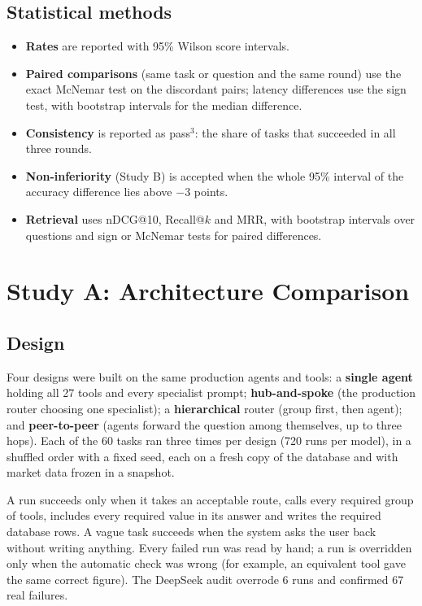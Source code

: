\documentclass[11pt,a4paper]{article}
\begin{document}
\subsection{Statistical methods}
\begin{itemize}
\item \textbf{Rates} are reported with 95\% Wilson score intervals.
\item \textbf{Paired comparisons} (same task or question and the same round) use the exact McNemar test on the discordant pairs; latency differences use the sign test, with bootstrap intervals for the median difference.
\item \textbf{Consistency} is reported as pass$^{3}$: the share of tasks that succeeded in all three rounds.
\item \textbf{Non-inferiority} (Study B) is accepted when the whole 95\% interval of the accuracy difference lies above $-3$ points.
\item \textbf{Retrieval} uses nDCG@10, Recall@$k$ and MRR, with bootstrap intervals over questions and sign or McNemar tests for paired differences.
\end{itemize}

\section{Study A: Architecture Comparison}

\subsection{Design}
Four designs were built on the same production agents and tools: a \textbf{single agent} holding all 27 tools and every specialist prompt; \textbf{hub-and-spoke} (the production router choosing one specialist); a \textbf{hierarchical} router (group first, then agent); and \textbf{peer-to-peer} (agents forward the question among themselves, up to three hops). Each of the 60 tasks ran three times per design (720 runs per model), in a shuffled order with a fixed seed, each on a fresh copy of the database and with market data frozen in a snapshot.

A run succeeds only when it takes an acceptable route, calls every required group of tools, includes every required value in its answer and writes the required database rows. A vague task succeeds when the system asks the user back without writing anything. Every failed run was read by hand; a run is overridden only when the automatic check was wrong (for example, an equivalent tool gave the same correct figure). The DeepSeek audit overrode 6 runs and confirmed 67 real failures.
\end{document}
